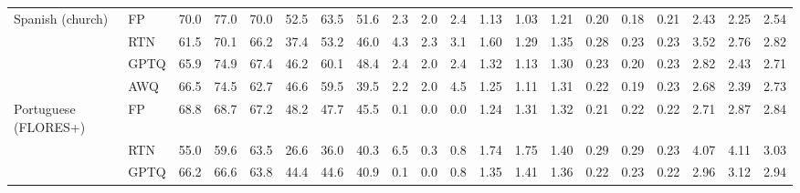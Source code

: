 \begin{landscape}
\begin{longtable}{llrrrrrrrrrrrrrrrrrr}
\midrule
Spanish (church) & FP & 70.0 & 77.0 & 70.0 & 52.5 & 63.5 & 51.6 & 2.3 & 2.0 & 2.4 & 1.13 & 1.03 & 1.21 & 0.20 & 0.18 & 0.21 & 2.43 & 2.25 & 2.54 \\
 & RTN & \cellcolor{loss!15}61.5 & \cellcolor{loss!12}70.1 & \cellcolor{loss!7}66.2 & \cellcolor{loss!26}37.4 & \cellcolor{loss!18}53.2 & \cellcolor{loss!10}46.0 & \cellcolor{loss!9}4.3 & \cellcolor{loss!1}2.3 & \cellcolor{loss!3}3.1 & \cellcolor{loss!12}1.60 & \cellcolor{loss!6}1.29 & \cellcolor{loss!4}1.35 & \cellcolor{loss!11}0.28 & \cellcolor{loss!7}0.23 & \cellcolor{loss!3}0.23 & \cellcolor{loss!2}3.52 & \cellcolor{loss!1}2.76 & \cellcolor{loss!1}2.82 \\
 & GPTQ & \cellcolor{loss!7}65.9 & \cellcolor{loss!4}74.9 & \cellcolor{loss!5}67.4 & \cellcolor{loss!11}46.2 & \cellcolor{loss!6}60.1 & \cellcolor{loss!6}48.4 & \cellcolor{loss!0}2.4 & \cellcolor{loss!0}2.0 & \cellcolor{loss!0}2.4 & \cellcolor{loss!5}1.32 & \cellcolor{loss!2}1.13 & \cellcolor{loss!2}1.30 & \cellcolor{loss!4}0.23 & \cellcolor{loss!2}0.20 & \cellcolor{loss!2}0.23 & \cellcolor{loss!1}2.82 & \cellcolor{loss!0}2.43 & \cellcolor{loss!0}2.71 \\
 & AWQ & \cellcolor{loss!6}66.5 & \cellcolor{loss!4}74.5 & \cellcolor{loss!13}62.7 & \cellcolor{loss!10}46.6 & \cellcolor{loss!7}59.5 & \cellcolor{loss!21}39.5 & 2.2 & \cellcolor{loss!0}2.0 & \cellcolor{loss!9}4.5 & \cellcolor{loss!3}1.25 & \cellcolor{loss!2}1.11 & \cellcolor{loss!2}1.31 & \cellcolor{loss!2}0.22 & \cellcolor{loss!1}0.19 & \cellcolor{loss!3}0.23 & \cellcolor{loss!0}2.68 & \cellcolor{loss!0}2.39 & \cellcolor{loss!0}2.73 \\
\midrule
Portuguese (FLORES+) & FP & 68.8 & 68.7 & 67.2 & 48.2 & 47.7 & 45.5 & 0.1 & 0.0 & 0.0 & 1.24 & 1.31 & 1.32 & 0.21 & 0.22 & 0.22 & 2.71 & 2.87 & 2.84 \\
 & RTN & \cellcolor{loss!24}55.0 & \cellcolor{loss!16}59.6 & \cellcolor{loss!7}63.5 & \cellcolor{loss!37}26.6 & \cellcolor{loss!20}36.0 & \cellcolor{loss!9}40.3 & \cellcolor{loss!28}6.5 & \cellcolor{loss!1}0.3 & \cellcolor{loss!3}0.8 & \cellcolor{loss!12}1.74 & \cellcolor{loss!11}1.75 & \cellcolor{loss!2}1.40 & \cellcolor{loss!11}0.29 & \cellcolor{loss!9}0.29 & \cellcolor{loss!1}0.23 & \cellcolor{loss!3}4.07 & \cellcolor{loss!2}4.11 & \cellcolor{loss!0}3.03 \\
 & GPTQ & \cellcolor{loss!5}66.2 & \cellcolor{loss!4}66.6 & \cellcolor{loss!6}63.8 & \cellcolor{loss!7}44.4 & \cellcolor{loss!5}44.6 & \cellcolor{loss!8}40.9 & \cellcolor{loss!0}0.1 & 0.0 & \cellcolor{loss!3}0.8 & \cellcolor{loss!3}1.35 & \cellcolor{loss!3}1.41 & \cellcolor{loss!1}1.36 & \cellcolor{loss!2}0.22 & \cellcolor{loss!2}0.23 & \cellcolor{loss!1}0.22 & \cellcolor{loss!0}2.96 & \cellcolor{loss!0}3.12 & \cellcolor{loss!0}2.94 \\

\end{longtable}
\end{landscape}
